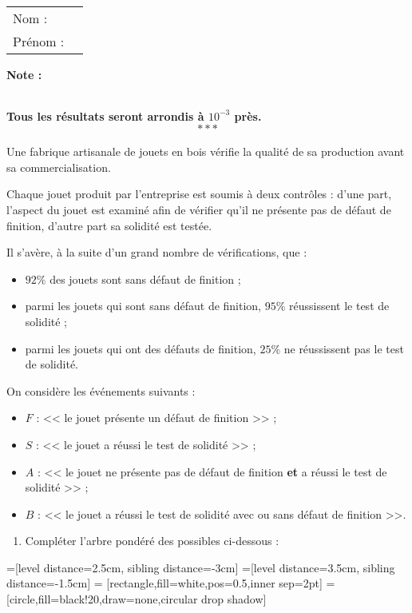 \documentclass[10pt,french]{book}
\newcommand\competences{
\setcounter{exo}{0}
\begin{tabular}{ll} Nom : \\[5pt] Prénom : \end{tabular}
\hfill
\textbf{Note :}\renewcommand\arraystretch{2.3}
\begin{tabularx}{0.18\linewidth}{|X|}
\hline
\slashbox{\Huge\bfseries\phantom{10}}{\Huge\bfseries 10}\\
\hline
\end{tabularx}\renewcommand\arraystretch{1}\medskip
}
\begin{document}

\competences

\textbf{Tous les résultats seront arrondis à $10^{-3}$ près.}\[***\]

\exo Une fabrique artisanale de jouets en bois vérifie la qualité de sa production avant sa commercialisation.\par
Chaque jouet produit par l'entreprise est soumis à deux contrôles : d'une part, l'aspect du jouet est examiné afin de vérifier qu'il ne présente pas de défaut de finition, d'autre part sa solidité est testée.\par
Il s'avère, à la suite d'un grand nombre de vérifications, que :
\begin{itemize}
    \item $92\%$ des jouets sont sans défaut de finition ;
    \item parmi les jouets qui sont sans défaut de finition, $95\%$ réussissent le test de solidité ;
    \item parmi les jouets qui ont des défauts de finition, $25\%$ ne réussissent pas le test de solidité.
\end{itemize}\medskip

On considère les événements suivants :
\begin{itemize}
    \item $F$ : << le jouet présente un défaut de finition >> ;
    \item $S$ : << le jouet a réussi le test de solidité >> ;
    \item $A$ : << le jouet ne présente pas de défaut de finition \textbf{et} a réussi le test de solidité >> ;
    \item $B$ : << le jouet a réussi le test de solidité avec ou sans défaut de finition >>.
\end{itemize}\medskip

\begin{enumerate}
    \item Compléter l'arbre pondéré des possibles ci-dessous :
\end{enumerate}

=[level distance=2.5cm, sibling distance=-3cm]
=[level distance=3.5cm, sibling distance=-1.5cm]
 = [rectangle,fill=white,pos=0.5,inner sep=2pt]
 = [circle,fill=black!20,draw=none,circular drop shadow]
\end{document}
